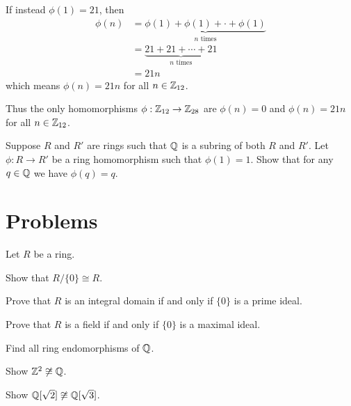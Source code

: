 \begin{example}
    If instead $\phi(1) = 21$, then
    \begin{align*}
        \phi(n) &= \underbrace{\phi(1) + \phi(1) + \cdot + \phi(1)}_{n \text{ times}}\\
        &= \underbrace{21 + 21 + \cdots + 21}_{n \text{ times}}\\
        &= 21n
    \end{align*}
    which means $\phi(n) = 21n$ for all $n \in \mathbb{Z}_{12}$.

    Thus the only homomorphisms $\phi: \mathbb{Z}_{12} \to \mathbb{Z}_{28}$ are $\phi(n) = 0$ and $\phi(n) = 21n$ for all $n \in \mathbb{Z}_{12}$.
\end{example}

\begin{exercise}\label{exercise-homomorphism-over-Q-fixes-elements-of-Q}
    Suppose $R$ and $R'$ are rings such that $\mathbb{Q}$ is a subring of both $R$ and $R'$. Let $\phi: R \to R'$ be a ring homomorphism such that $\phi(1) = 1$. Show that for any $q \in \mathbb{Q}$ we have $\phi(q) = q$.
\end{exercise}

\newpage

\section{Problems}
\begin{problem}\label{problem-integral-domain-iff-trivial-ideal-is-prime}
    Let $R$ be a ring.
    \begin{partquestions}{\roman*}
        \item Show that $R/\{0\} \cong R$.
        \item Prove that $R$ is an integral domain if and only if $\{0\}$ is a prime ideal.
        \item Prove that $R$ is a field if and only if $\{0\}$ is a maximal ideal.
    \end{partquestions}
\end{problem}

\begin{problem}
    Find all ring endomorphisms of $\mathbb{Q}$.
\end{problem}

\begin{problem}
    Show $\mathbb{Z}^2 \not\cong \mathbb{Q}$.
\end{problem}

\begin{problem}
    Show $\mathbb{Q}[\sqrt2] \not\cong \mathbb{Q}[\sqrt3]$.
\end{problem}

